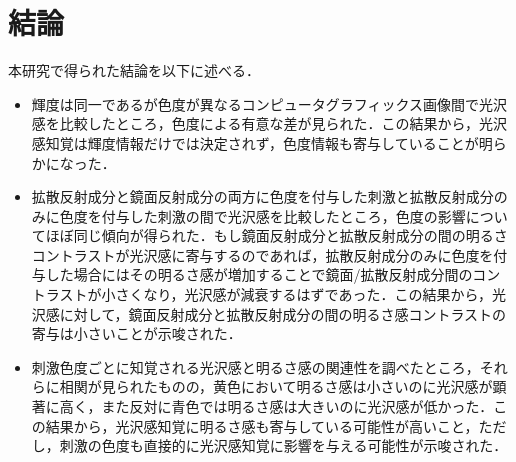 \chapter{結論}

    本研究で得られた結論を以下に述べる．
    \begin{itemize}
        \item 輝度は同一であるが色度が異なるコンピュータグラフィックス画像間で光沢感を比較したところ，色度による有意な差が見られた．この結果から，光沢感知覚は輝度情報だけでは決定されず，色度情報も寄与していることが明らかになった．
        \item 拡散反射成分と鏡面反射成分の両方に色度を付与した刺激と拡散反射成分のみに色度を付与した刺激の間で光沢感を比較したところ，色度の影響についてほぼ同じ傾向が得られた．もし鏡面反射成分と拡散反射成分の間の明るさコントラストが光沢感に寄与するのであれば，拡散反射成分のみに色度を付与した場合にはその明るさ感が増加することで鏡面/拡散反射成分間のコントラストが小さくなり，光沢感が減衰するはずであった．この結果から，光沢感に対して，鏡面反射成分と拡散反射成分の間の明るさ感コントラストの寄与は小さいことが示唆された．
        \item 刺激色度ごとに知覚される光沢感と明るさ感の関連性を調べたところ，それらに相関が見られたものの，黄色において明るさ感は小さいのに光沢感が顕著に高く，また反対に青色では明るさ感は大きいのに光沢感が低かった．この結果から，光沢感知覚に明るさ感も寄与している可能性が高いこと，ただし，刺激の色度も直接的に光沢感知覚に影響を与える可能性が示唆された．
    \end{itemize}
    \newpage